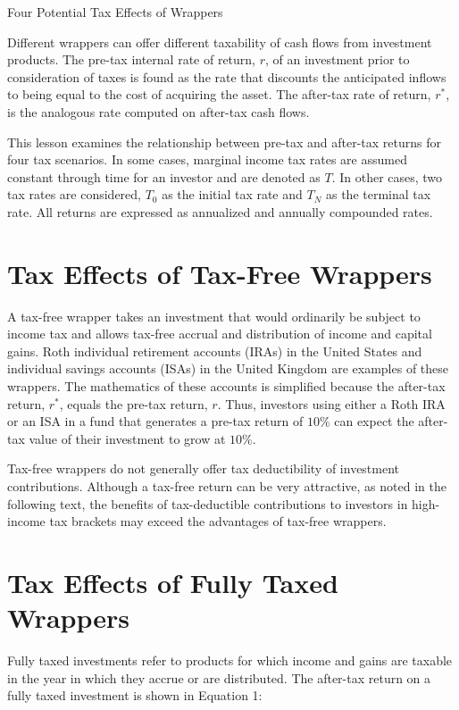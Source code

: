 \documentclass[11pt]{article}
\begin{document}
Four Potential Tax Effects of Wrappers

Different wrappers can offer different taxability of cash flows from investment products. The pre-tax internal rate of return, $r$, of an investment prior to consideration of taxes is found as the rate that discounts the anticipated inflows to being equal to the cost of acquiring the asset. The after-tax rate of return, $r^{*}$, is the analogous rate computed on after-tax cash flows.

This lesson examines the relationship between pre-tax and after-tax returns for four tax scenarios. In some cases, marginal income tax rates are assumed constant through time for an investor and are denoted as $T$. In other cases, two tax rates are considered, $T_{0}$ as the initial tax rate and $T_{N}$ as the terminal tax rate. All returns are expressed as annualized and annually compounded rates.

\section*{Tax Effects of Tax-Free Wrappers}
A tax-free wrapper takes an investment that would ordinarily be subject to income tax and allows tax-free accrual and distribution of income and capital gains. Roth individual retirement accounts (IRAs) in the United States and individual savings accounts (ISAs) in the United Kingdom are examples of these wrappers. The mathematics of these accounts is simplified because the after-tax return, $r^{*}$, equals the pre-tax return, $r$. Thus, investors using either a Roth IRA or an ISA in a fund that generates a pre-tax return of $10 \%$ can expect the after-tax value of their investment to grow at $10 \%$.

Tax-free wrappers do not generally offer tax deductibility of investment contributions. Although a tax-free return can be very attractive, as noted in the following text, the benefits of tax-deductible contributions to investors in high-income tax brackets may exceed the advantages of tax-free wrappers.

\section*{Tax Effects of Fully Taxed Wrappers}
Fully taxed investments refer to products for which income and gains are taxable in the year in which they accrue or are distributed. The after-tax return on a fully taxed investment is shown in Equation 1:
\end{document}
